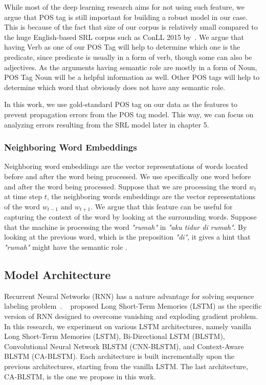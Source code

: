 While most of the deep learning research aims for not using such feature, we argue that POS tag is still important for building a robust model in our case. This is because of the fact that size of our corpus is relatively small compared to the huge English-based SRL corpus such as ConLL 2015 by~\cite{carreras2005introduction}. We argue that having Verb as one of our POS Tag will help to determine which one is the predicate, since predicate is usually in a form of verb, though some can also be adjectives. As the arguments having semantic role are mostly in a form of Noun, POS Tag Noun will be a helpful information as well. Other POS tags will help to determine which word that obviously does not have any semantic role.

In this work, we use gold-standard POS tag on our data as the features to prevent propagation errors from the POS tag model. This way, we can focus on analyzing errors resulting from the SRL model later in chapter 5. 

\subsubsection{Neighboring Word Embeddings}
Neighboring word embeddings are the vector representations of words located before and after the word being processed. We use specifically one word before and after the word being processed. Suppose that we are processing the word $w_{t}$ at time step $t$, the neighboring words embeddings are the vector representations of the word $w_{t-1}$ and $w_{t+1}$. We argue that this feature can be useful for capturing the context of the word by looking at the surrounding words. Suppose that the machine is processing the word \textit{"rumah"} in \textit{"aku tidur di rumah"}. By looking at the previous word, which is the preposition \textit{"di"}, it gives a hint that \textit{"rumah"} might have the semantic role \location.

\subsection{Model Architecture}
Recurrent Neural Networks (RNN) has a nature advantage for solving sequence labeling problem~\cite{zhou2015end}. ~\cite{hochreiter1997long} proposed Long Short-Term Memories (LSTM) as the specific version of RNN designed to overcome vanishing and exploding gradient problem. In this research, we experiment on various LSTM architectures, namely vanilla Long Short-Term Memories (LSTM), Bi-Directional LSTM (BLSTM), Convolutional Neural Network BLSTM (CNN-BLSTM), and Context-Aware BLSTM (CA-BLSTM). Each architecture is built incrementally upon the previous architectures, starting from the vanilla LSTM. The last architecture, CA-BLSTM, is the one we propose in this work.

